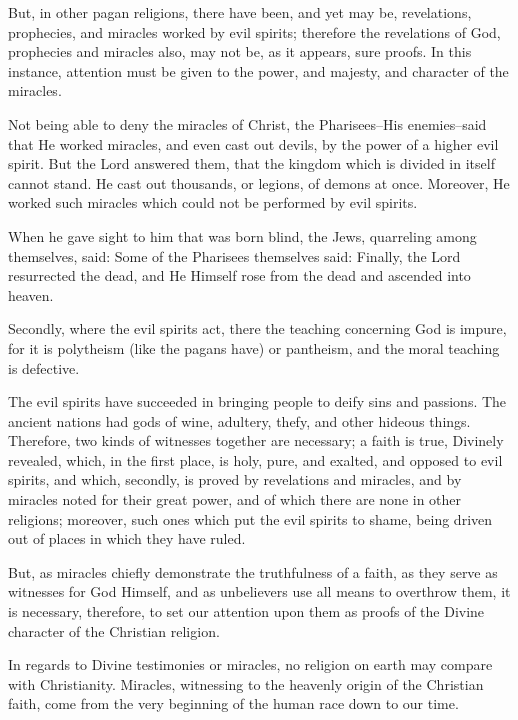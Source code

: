 But, in other pagan religions, there have been, and yet may be, revelations, prophecies, and miracles worked by evil spirits; therefore the revelations of God, prophecies and miracles also, may not be, as it appears, sure proofs. In this instance, attention must be given to the power, and majesty, and character of the miracles.

Not being able to deny the miracles of Christ, the Pharisees--His enemies--said that He worked miracles, and even cast out devils, by the power of a higher evil spirit. But the Lord answered them, that the kingdom which is divided in itself cannot stand. He cast out thousands, or legions, of demons at once. Moreover, He worked such miracles which could not be performed by evil spirits.

When he gave sight to him that was born blind, the Jews, quarreling among themselves, said:  Some of the Pharisees themselves said:  Finally, the Lord resurrected the dead, and He Himself rose from the dead and ascended into heaven.

Secondly, where the evil spirits act, there the teaching concerning God is impure, for it is polytheism (like the pagans have) or pantheism, and the moral teaching is defective.

The evil spirits have succeeded in bringing people to deify sins and passions. The ancient nations had gods of wine, adultery, thefy, and other hideous things. Therefore, two kinds of witnesses together are necessary; a faith is true, Divinely revealed, which, in the first place, is holy, pure, and exalted, and opposed to evil spirits, and which, secondly, is proved by revelations and miracles, and by miracles noted for their great power, and of which there are none in other religions; moreover, such ones which put the evil spirits to shame, being driven out of places in which they have ruled.

But, as miracles chiefly demonstrate the truthfulness of a faith, as they serve as witnesses for God Himself, and as unbelievers use all means to overthrow them, it is necessary, therefore, to set our attention upon them as proofs of the Divine character of the Christian religion.

In regards to Divine testimonies or miracles, no religion on earth may compare with Christianity. Miracles, witnessing to the heavenly origin of the Christian faith, come from the very beginning of the human race down to our time.


